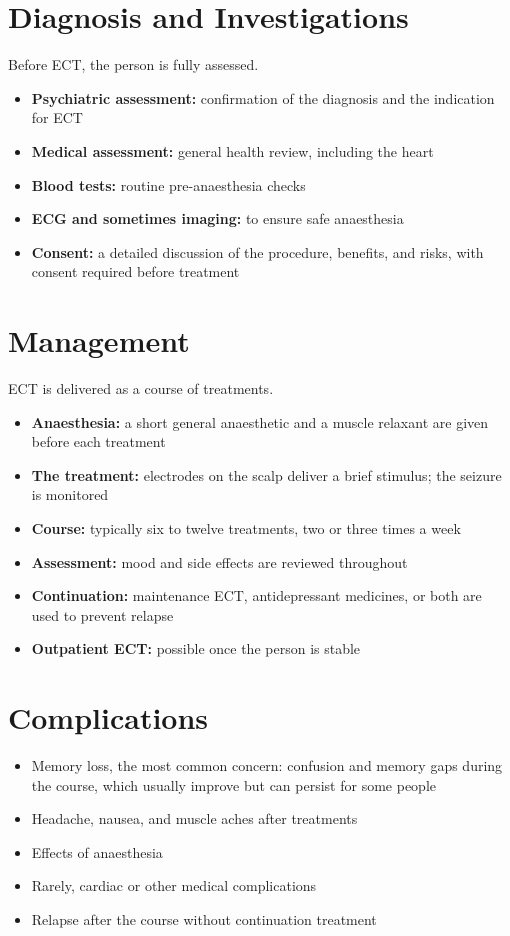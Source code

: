 \section*{Diagnosis and Investigations}
Before ECT, the person is fully assessed.
\begin{itemize}
    \item \textbf{Psychiatric assessment:} confirmation of the diagnosis and the indication for ECT
    \item \textbf{Medical assessment:} general health review, including the heart
    \item \textbf{Blood tests:} routine pre-anaesthesia checks
    \item \textbf{ECG and sometimes imaging:} to ensure safe anaesthesia
    \item \textbf{Consent:} a detailed discussion of the procedure, benefits, and risks, with consent required before treatment
\end{itemize}

\section*{Management}
ECT is delivered as a course of treatments.
\begin{itemize}
    \item \textbf{Anaesthesia:} a short general anaesthetic and a muscle relaxant are given before each treatment
    \item \textbf{The treatment:} electrodes on the scalp deliver a brief stimulus; the seizure is monitored
    \item \textbf{Course:} typically six to twelve treatments, two or three times a week
    \item \textbf{Assessment:} mood and side effects are reviewed throughout
    \item \textbf{Continuation:} maintenance ECT, antidepressant medicines, or both are used to prevent relapse
    \item \textbf{Outpatient ECT:} possible once the person is stable
\end{itemize}

\section*{Complications}
\begin{itemize}
    \item Memory loss, the most common concern: confusion and memory gaps during the course, which usually improve but can persist for some people
    \item Headache, nausea, and muscle aches after treatments
    \item Effects of anaesthesia
    \item Rarely, cardiac or other medical complications
    \item Relapse after the course without continuation treatment
\end{itemize}

